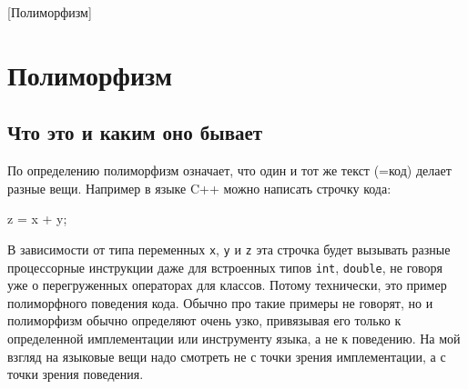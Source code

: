[Полиморфизм]


\section{Полиморфизм}
\label{section::Polymorphism}

\subsection{Что это и каким оно бывает}

По определению полиморфизм означает, что один и тот же текст (=код) делает разные вещи.
Например в языке C++ можно написать строчку кода:
\begin{cppcode}
z = x + y;
\end{cppcode}
В зависимости от типа переменных \texttt{x}, \texttt{y} и \texttt{z} эта строчка будет вызывать разные процессорные инструкции даже для встроенных типов \texttt{int}, \texttt{double}, не говоря уже о перегруженных операторах для классов.
Потому технически, это пример полиморфного поведения кода.
Обычно про такие примеры не говорят, но и полиморфизм обычно определяют очень узко, привязывая его только к определенной имплементации или инструменту языка, а не к поведению.
На мой взгляд на языковые вещи надо смотреть не с точки зрения имплементации, а с точки зрения поведения.

